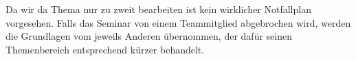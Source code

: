 \documentclass{article}
\begin{document}
Da wir da Thema nur zu zweit bearbeiten ist kein wirklicher Notfallplan vorgesehen. 
Falls das Seminar von einem Teammitglied abgebrochen wird, werden die Grundlagen vom jeweils Anderen übernommen, der dafür seinen Themenbereich entsprechend kürzer behandelt.


\end{document}

